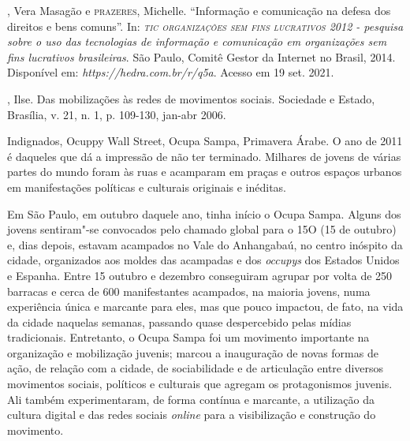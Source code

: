\begin{bibliohedra}
, Vera Masagão e \textsc{prazeres}, Michelle. ``Informação e comunicação
na defesa dos direitos e bens comuns''. In: \emph{\textsc{tic organizações sem
fins lucrativos} 2012 - pesquisa sobre o uso das tecnologias de
informação e comunicação em organizações sem fins lucrativos
brasileiras}. São Paulo, Comitê Gestor da Internet no Brasil, 2014.
Disponível em:
\emph{https://hedra.com.br/r/q5a}.
Acesso em 19 set. 2021.

, Ilse. Das mobilizações às redes de movimentos sociais.
Sociedade e Estado, Brasília, v. 21, n. 1, p. 109-130, jan-abr 2006.
\end{bibliohedra}



\noindent{}Indignados, Ocuppy Wall Street, Ocupa Sampa, Primavera Árabe. O ano de
2011 é daqueles que dá a impressão de não ter terminado. Milhares de
jovens de várias partes do mundo foram às ruas e acamparam em praças e
outros espaços urbanos em manifestações políticas e culturais originais
e inéditas.

Em São Paulo, em outubro daquele ano, tinha início o Ocupa Sampa. Alguns
dos jovens sentiram"-se convocados pelo chamado global para o 15O (15 de
outubro) e, dias depois, estavam acampados no Vale do Anhangabaú, no
centro inóspito da cidade, organizados aos moldes das acampadas e dos
\emph{occupys} dos Estados Unidos e Espanha. Entre 15 outubro e dezembro
conseguiram agrupar por volta de 250 barracas e cerca de 600
manifestantes acampados, na maioria jovens, numa experiência única e
marcante para eles, mas que pouco impactou, de fato, na vida da cidade
naquelas semanas, passando quase despercebido pelas mídias tradicionais.
Entretanto, o Ocupa Sampa foi um movimento importante na organização e
mobilização juvenis; marcou a inauguração de novas formas de ação, de
relação com a cidade, de sociabilidade e de articulação entre diversos
movimentos sociais, políticos e culturais que agregam os protagonismos
juvenis. Ali também experimentaram, de forma contínua e marcante, a
utilização da cultura digital e das redes sociais \emph{\emph{online}} para a
visibilização e construção do movimento.

